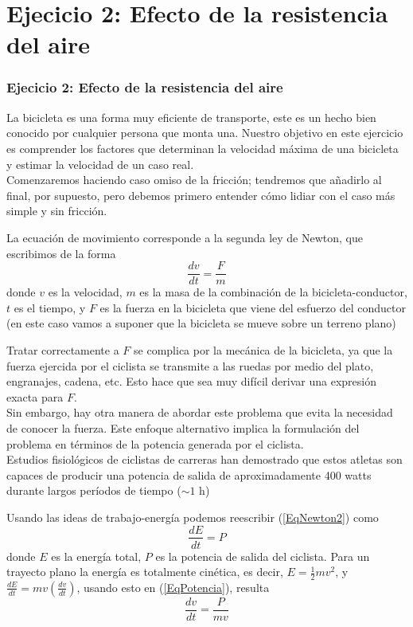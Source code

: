 \section{Ejecicio 2: Efecto de la resistencia del aire}
\begin{frame}
\frametitle{Ejecicio 2: Efecto de la resistencia del aire}
La bicicleta es una forma muy eficiente de transporte, este es un hecho bien conocido por cualquier persona que monta una. Nuestro objetivo en este ejercicio es comprender los factores que determinan la velocidad m\'{a}xima de una bicicleta y estimar la velocidad de un caso real.
\\
\bigskip
Comenzaremos haciendo caso omiso de la fricci\'{o}n; tendremos que añadirlo al final, por supuesto, pero debemos primero entender c\'{o}mo lidiar con el caso m\'{a}s simple y sin fricci\'{o}n.
\end{frame}
\begin{frame}
La ecuaci\'{o}n de movimiento corresponde a la segunda ley de Newton, que escribimos de la forma
\begin{equation}\label{EqNewton2}
\dfrac{dv}{dt} = \dfrac{F}{m}
\end{equation}
donde $v$ es la velocidad, $m$ es la masa de la combinaci\'{o}n de la bicicleta-conductor, $t$ es el tiempo, y $F$ es la fuerza en la bicicleta que viene del esfuerzo del conductor (en este caso vamos a suponer que la bicicleta se mueve sobre un terreno plano)
\end{frame}
\begin{frame}
Tratar correctamente a $F$ se complica por la mec\'{a}nica de la bicicleta, ya que la fuerza ejercida por el ciclista se transmite a las ruedas por medio del plato, engranajes, cadena, etc. Esto hace que sea muy dif\'{i}cil derivar una expresi\'{o}n exacta para $F$.
\\
\medskip
Sin embargo, hay otra manera de abordar este problema que evita la necesidad de conocer la fuerza. Este enfoque alternativo implica la formulaci\'{o}n del problema en t\'{e}rminos de la potencia generada por el ciclista.
\\
\medskip
Estudios fisiol\'{o}gicos de ciclistas de carreras han demostrado que estos atletas son capaces de producir una potencia de salida de aproximadamente 400 watts durante largos per\'{i}odos de tiempo ($\sim 1$ h)
\end{frame}
\begin{frame}
Usando las ideas de trabajo-energ\'{i}a podemos reescribir (\ref{EqNewton2}) como
\begin{equation}\label{EqPotencia}
\dfrac{dE}{dt} = P
\end{equation}
donde $E$ es la energ\'{i}a total, $P$ es la potencia de salida del ciclista. Para un trayecto plano la energ\'{i}a es totalmente cin\'{e}tica, es decir, $E = \frac{1}{2} m v^{2}$, y $\frac{dE}{dt} = mv (\frac{dv}{dt})$, usando esto en (\ref{EqPotencia}), resulta
\begin{equation}\label{EqPotenciavel}
\dfrac{dv}{dt} = \dfrac{P}{mv}
\end{equation}
\end{frame}
